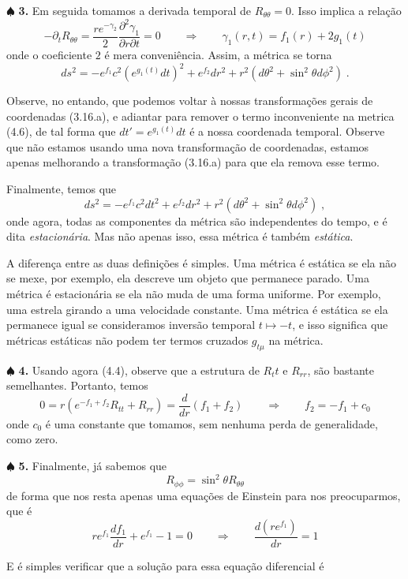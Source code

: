 \documentclass[11pt]{article}
\begin{document}
    \(\spadesuit\) \textbf{3.} Em seguida tomamos a derivada temporal de
\(R_{\theta\theta} = 0\). Isso implica a relação
\[\tag{4.5} -\partial_t R_{\theta\theta} = \frac{r e^{-\gamma_2}}{2}\frac{\partial^2 \gamma_1}{\partial r \partial t} = 0 \qquad \Rightarrow \qquad \gamma_1(r,t)=f_1(r) + 2g_1(t)\]
onde o coeficiente \(2\) é mera conveniência. Assim, a métrica se torna
\[ \tag{4.6} ds^2 = - e^{f_1} c^2 (e^{g_1(t)}dt)^2 + e^{f_2}dr^2 + r^2 (d\theta^2 + \sin^2\theta d\phi^2)\; .\]

Observe, no entando, que podemos voltar à nossas transformações gerais
de coordenadas (3.16.a), e adiantar para remover o termo inconveniente
na metrica (4.6), de tal forma que \(dt' = e^{g_1(t)}dt\) é a nossa
coordenada temporal. Observe que não estamos usando uma nova
transformação de coordenadas, estamos apenas melhorando a transformação
(3.16.a) para que ela remova esse termo.

Finalmente, temos que
\[ \tag{4.7} ds^2 = - e^{f_1} c^2 dt^2 + e^{f_2}dr^2 + r^2 (d\theta^2 + \sin^2\theta d\phi^2)\; ,\]
onde agora, todas as componentes da métrica são independentes do tempo,
e é dita \emph{estacionária}. Mas não apenas isso, essa métrica é também
\emph{estática}.

A diferença entre as duas definições é simples. Uma métrica é estática
se ela não se mexe, por exemplo, ela descreve um objeto que permanece
parado. Uma métrica é estacionária se ela não muda de uma forma
uniforme. Por exemplo, uma estrela girando a uma velocidade constante.
Uma métrica é estática se ela permanece igual se consideramos inversão
temporal \(t\mapsto -t\), e isso significa que métricas estáticas não
podem ter termos cruzados \(g_{t\mu}\) na métrica.

    \(\spadesuit\) \textbf{4.} Usando agora (4.4), observe que a estrutura
de \(R_tt\) e \(R_{rr}\), são bastante semelhantes. Portanto, temos
\[\tag{4.7} 0 = r(e^{-f_1 + f_2}R_{tt} + R_{rr}) = \frac{d}{dr}(f_1 + f_2)\qquad \Rightarrow \qquad  f_2 = -f_1 + c_0 \]
onde \(c_0\) é uma constante que tomamos, sem nenhuma perda de
generalidade, como zero.

    \(\spadesuit\) \textbf{5.} Finalmente, já sabemos que
\[ \tag{4.8} R_{\phi\phi} = \sin^2 \theta R_{\theta\theta}\] de forma
que nos resta apenas uma equações de Einstein para nos preocuparmos, que
é
\[ \tag{4.9} r e^{f_1} \frac{d f_1}{dr}  + e^{f_1} - 1 = 0 \qquad \Rightarrow \qquad \frac{d(r e^{f_1})}{dr} = 1  \]

    E é simples verificar que a solução para essa equação diferencial é
\end{document}
